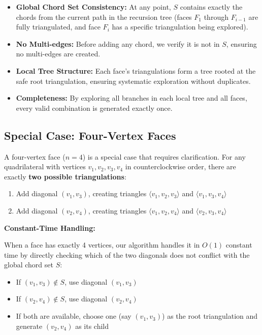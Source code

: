 \documentclass[12pt,a4paper]{article}
\theoremstyle{definition}
\theoremstyle{remark}
\begin{document}
\begin{itemize}
    \item \textbf{Global Chord Set Consistency:} At any point, $S$ contains exactly the chords from the current path in the recursion tree (faces $F_1$ through $F_{i-1}$ are fully triangulated, and face $F_i$ has a specific triangulation being explored).
    
    \item \textbf{No Multi-edges:} Before adding any chord, we verify it is not in $S$, ensuring no multi-edges are created.
    
    \item \textbf{Local Tree Structure:} Each face's triangulations form a tree rooted at the safe root triangulation, ensuring systematic exploration without duplicates.
    
    \item \textbf{Completeness:} By exploring all branches in each local tree and all faces, every valid combination is generated exactly once.
\end{itemize}

\subsection{Special Case: Four-Vertex Faces}
\label{subsec:four_vertex_faces}

A four-vertex face ($n = 4$) is a special case that requires clarification. For any quadrilateral with vertices $v_1, v_2, v_3, v_4$ in counterclockwise order, there are exactly \textbf{two possible triangulations}:

\begin{enumerate}
    \item Add diagonal $(v_1, v_3)$, creating triangles $\langle v_1, v_2, v_3 \rangle$ and $\langle v_1, v_3, v_4 \rangle$
    \item Add diagonal $(v_2, v_4)$, creating triangles $\langle v_1, v_2, v_4 \rangle$ and $\langle v_2, v_3, v_4 \rangle$
\end{enumerate}

\textbf{Constant-Time Handling:}

When a face has exactly 4 vertices, our algorithm handles it in $O(1)$ constant time by directly checking which of the two diagonals does not conflict with the global chord set $S$:

\begin{itemize}
    \item If $(v_1, v_3) \notin S$, use diagonal $(v_1, v_3)$
    \item If $(v_2, v_4) \notin S$, use diagonal $(v_2, v_4)$
    \item If both are available, choose one (say $(v_1, v_3)$) as the root triangulation and generate $(v_2, v_4)$ as its child
\end{itemize}
\end{document}
